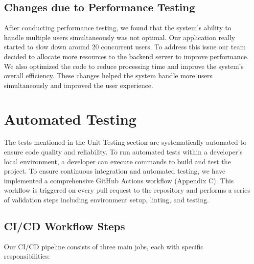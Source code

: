\documentclass[12pt, titlepage]{article}
\begin{document}
\subsection{Changes due to Performance Testing}
After conducting performance testing, we found that the system's ability to handle multiple users simultaneously was not optimal. Our application really started to slow down around 20 concurrent users. To address this issue our team decided to allocate more resources to the backend server to improve performance. We also optimized the code to reduce processing time and improve the system's overall efficiency. These changes helped the system handle more users simultaneously and improved the user experience.
\newpage
\section{Automated Testing}

The tests mentioned in the Unit Testing section are systematically automated to ensure code quality and reliability. To run automated tests within a developer's local environment, a developer can execute commands to build and test the project.
\newline
To ensure continuous integration and automated testing, we have implemented a comprehensive GitHub Actions workflow (Appendix C). This workflow is triggered on every pull request to the repository and performs a series of validation steps including environment setup, linting, and testing.
\subsection{CI/CD Workflow Steps}

Our CI/CD pipeline consists of three main jobs, each with specific responsibilities:
\end{document}
